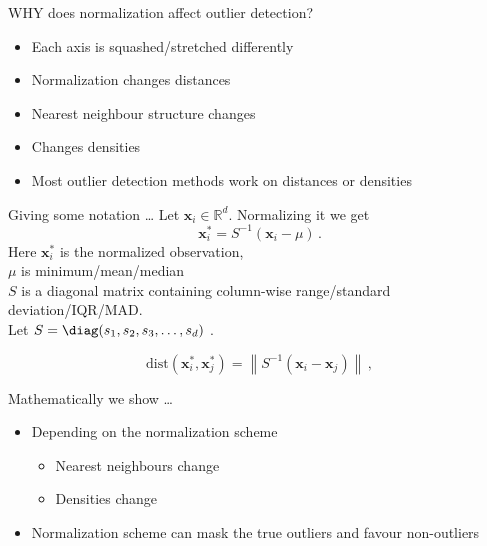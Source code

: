 \documentclass{beamer}
\newcommand{\dist}{\text{dist}}
\begin{document}
\begin{darkframes}
	
	\begin{frame}{WHY does normalization affect outlier detection?}
	\begin{itemize}
		\item Each axis is squashed/stretched differently
		\item Normalization changes distances
		\item Nearest neighbour structure changes
		\item Changes densities
		\vspace{1cm}
		\item {\Large Most outlier detection methods work on distances or densities}
		
	\end{itemize}
	\end{frame}

	\begin{frame}{Giving some notation \ldots }
	Let  $\mathbf{x}_i \in \mathbb{R}^d$. Normalizing it we get 
	\begin{equation*}\label{eq:norm1}
	\mathbf{x}^*_i = S^{-1}\left(\mathbf{x}_i - \mu \right) \, .
	\end{equation*}
	Here $\mathbf{x}^*_i$ is the normalized observation,  \\
	$\mu$ is minimum/mean/median  \\
	$S$ is a diagonal matrix containing column-wise range/standard deviation/IQR/MAD. \\
	 Let $S = \diag(s_1, s_2, s_3, \dots, s_d)$ . %
	
	\begin{equation*}\label{eq:norm2}
	\dist(\mathbf{x}^*_i, \mathbf{x}^*_j) = \left\lVert S^{-1}\left(\mathbf{x}_i - \mathbf{x}_j \right) \right\rVert \, ,
	\end{equation*}
	\end{frame}	

	\begin{frame}{Mathematically we show \ldots  }
    \begin{itemize}
        \item Depending on the normalization scheme
        \begin{itemize}
            \item Nearest neighbours change
            \item Densities change
        \end{itemize}
        \item Normalization scheme can mask the true outliers and favour non-outliers  
    \end{itemize}
    \end{frame}


\end{darkframes}
\end{document}
